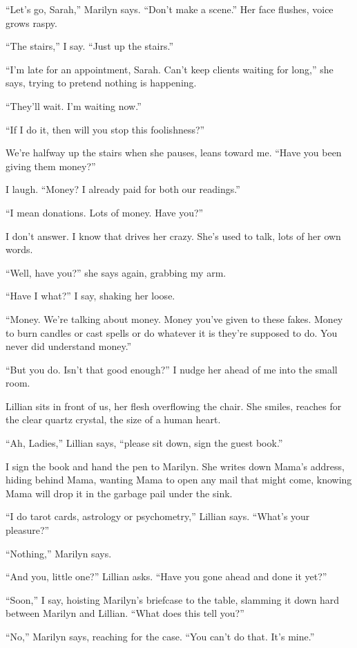 \documentclass[twoside,10pt]{book}
\begin{document}
``Let's go, Sarah,'' Marilyn says. ``Don't make a scene.'' Her face
flushes, voice grows raspy.

``The stairs,'' I say. ``Just up the stairs.''

``I'm late for an appointment, Sarah. Can't keep clients waiting for
long,'' she says, trying to pretend nothing is happening.

``They'll wait. I'm waiting now.''

``If I do it, then will you stop this foolishness?''

We're halfway up the stairs when she pauses, leans toward me. ``Have you
been giving them money?''

I laugh. ``Money? I already paid for both our readings.''

``I mean donations. Lots of money. Have you?''

I don't answer. I know that drives her crazy. She's used to talk, lots
of her own words.

``Well, have you?'' she says again, grabbing my arm.

``Have I what?'' I say, shaking her loose.

``Money. We're talking about money. Money you've given to these fakes.
Money to burn candles or cast spells or do whatever it is they're
supposed to do. You never did understand money.''

``But you do. Isn't that good enough?'' I nudge her ahead of me into the
small room.

Lillian sits in front of us, her flesh overflowing the chair. She
smiles, reaches for the clear quartz crystal, the size of a human heart.

``Ah, Ladies,'' Lillian says, ``please sit down, sign the guest book.''

I sign the book and hand the pen to Marilyn. She writes down Mama's
address, hiding behind Mama, wanting Mama to open any mail that might
come, knowing Mama will drop it in the garbage pail under the sink.

``I do tarot cards, astrology or psychometry,'' Lillian says. ``What's
your pleasure?''

``Nothing,'' Marilyn says.

``And you, little one?'' Lillian asks. ``Have you gone ahead and done it
yet?''

``Soon,'' I say, hoisting Marilyn's briefcase to the table, slamming it
down hard between Marilyn and Lillian. ``What does this tell you?''

``No,'' Marilyn says, reaching for the case. ``You can't do that. It's
mine.''
\end{document}
